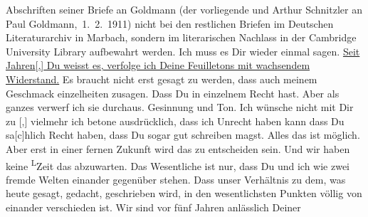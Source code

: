 \begin{ledgroupsized}[t]{13cm}
{{{                  Abschriften seiner Briefe an Goldmann (der
                  vorliegende und Arthur Schnitzler an Paul Goldmann, 1. 2. 1911) nicht bei den
                  restlichen Briefen im Deutschen Literaturarchiv in Marbach, sondern im
                  literarischen Nachlass in der Cambridge University Library aufbewahrt
                  werden.}}}\label{K_L03520-1h} Ich muss es Dir wieder einmal sagen. \uline{Seit Jahren{[},{]} Du weisst es, verfolge ich Deine Feuilletons
                  mit wachsendem Widerstand.} Es braucht nicht
               erst gesagt zu werden, dass auch meinem Geschmack einzelheiten zusagen. Dass Du in
               einzelnem Recht hast. Aber als ganzes verwerf ich sie durchaus. Gesinnung und Ton.
               Ich wünsche nicht mit Dir zu \label{K_L03520-15v}\label{K_L03520-15h}{[},{]} vielmehr ich betone ausdrücklich, dass ich Unrecht haben
                  kann\label{T_L03520-1v}\label{T_L03520-1h} dass Du
                  sa{[}c{]}hlich Recht haben, dass Du sogar gut schreiben magst.
               Alles das ist möglich. Aber erst in einer fernen Zukunft wird das zu entscheiden
               sein. Und wir haben keine \substVorne{}\textsuperscript{L}\substDazwischen{}Z\substHinten{}eit das abzuwarten. Das Wesentliche ist nur, dass Du und ich  wie zwei fremde Welten einander gegenüber stehen.
               Dass unser Verhältnis zu dem, was heute gesagt, gedacht, geschrieben wird, in den
               wesentlichsten Punkten völlig von einander verschieden ist. Wir sind vor fünf {\pb}Jahren anlässlich Deiner \label{K_L03520-11v}
\end{ledgroupsized}
